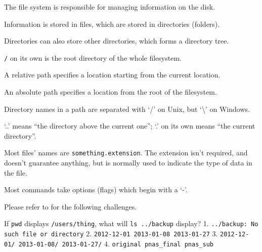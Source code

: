 \documentclass{book}
\begin{document}
\begin{keypoints}
\begin{swcitemize}
\item
  The file system is responsible for managing information on the disk.
\item
  Information is stored in files, which are stored in directories
  (folders).
\item
  Directories can also store other directories, which forms a directory
  tree.
\item
  \texttt{/} on its own is the root directory of the whole filesystem.
\item
  A relative path specifies a location starting from the current
  location.
\item
  An absolute path specifies a location from the root of the filesystem.
\item
  Directory names in a path are separated with `/' on Unix, but
  `\textbackslash{}' on Windows.
\item
  `..' means ``the directory above the current one''; `.' on its own
  means ``the current directory''.
\item
  Most files' names are \texttt{something.extension}. The extension
  isn't required, and doesn't guarantee anything, but is normally used
  to indicate the type of data in the file.
\item
  Most commands take options (flags) which begin with a `-'.
\end{swcitemize}
\end{keypoints}

Please refer to  for the following challenges.


\begin{challenge}

  If \texttt{pwd} displays \texttt{/users/thing}, what will
  \texttt{ls ../backup} display? 1.
  \texttt{../backup: No such file or directory} 2.
  \texttt{2012-12-01 2013-01-08 2013-01-27} 3.
  \texttt{2012-12-01/ 2013-01-08/ 2013-01-27/} 4.
  \texttt{original pnas\_final pnas\_sub}

\end{challenge}
\end{document}
